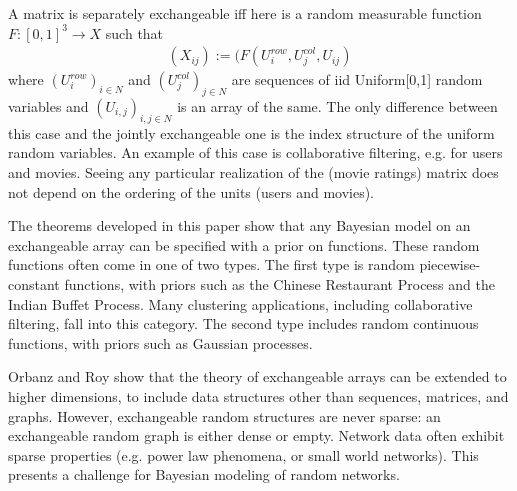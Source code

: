 \documentclass[12pt,letterpaper]{article}
\begin{document}
A matrix is separately exchangeable iff here is a random measurable function $F : [0,1]^3 \rightarrow X$ such that 
\begin{eqnarray}
(X_{ij}) := (F(U_i^{row}, U_j^{col}, U_{ij})
\end{eqnarray}
where $(U_i^{row})_{i \in N}$ and $(U_j^{col})_{j \in N}$ are sequences of iid Uniform[0,1] random variables and $(U_{i,j})_{i,j \in N}$ is an array of the same. The only difference between this case and the jointly exchangeable one is the index structure of the uniform random variables. An example of this case is collaborative filtering, e.g. for users and movies. Seeing any particular realization of the (movie ratings) matrix does not depend on the ordering of the units (users and movies). 

The theorems developed in this paper show that any Bayesian model on an exchangeable array can be specified with a prior on functions. These random functions often come in one of two types. The first type is random piecewise-constant functions, with priors such as the Chinese Restaurant Process and the Indian Buffet Process. Many clustering applications, including collaborative filtering, fall into this category. The second type includes random continuous functions, with priors such as Gaussian processes. 

Orbanz and Roy show that the theory of exchangeable arrays can be extended to higher dimensions, to include data structures other than sequences, matrices, and graphs. However, exchangeable random structures are never sparse: an exchangeable random graph is either dense or empty. Network data often exhibit sparse properties (e.g. power law phenomena, or small world networks). This presents a challenge for Bayesian modeling of random networks.  
\end{document}
